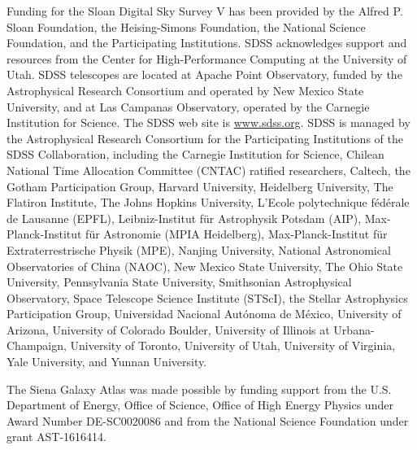 \documentclass{aa}
\begin{document}
\begin{acknowledgements}
Funding for the Sloan Digital Sky Survey V has been provided by the Alfred P. Sloan Foundation, the Heising-Simons Foundation, the National Science Foundation, and the Participating Institutions. SDSS acknowledges support and resources from the Center for High-Performance Computing at the University of Utah. SDSS telescopes are located at Apache Point Observatory, funded by the Astrophysical Research Consortium and operated by New Mexico State University, and at Las Campanas Observatory, operated by the Carnegie Institution for Science. The SDSS web site is \url{www.sdss.org}.
SDSS is managed by the Astrophysical Research Consortium for the Participating Institutions of the SDSS Collaboration, including the Carnegie Institution for Science, Chilean National Time Allocation Committee (CNTAC) ratified researchers, Caltech, the Gotham Participation Group, Harvard University, Heidelberg University, The Flatiron Institute, The Johns Hopkins University, L'Ecole polytechnique f\'{e}d\'{e}rale de Lausanne (EPFL), Leibniz-Institut f\"{u}r Astrophysik Potsdam (AIP), Max-Planck-Institut f\"{u}r Astronomie (MPIA Heidelberg), Max-Planck-Institut f\"{u}r Extraterrestrische Physik (MPE), Nanjing University, National Astronomical Observatories of China (NAOC), New Mexico State University, The Ohio State University, Pennsylvania State University, Smithsonian Astrophysical Observatory, Space Telescope Science Institute (STScI), the Stellar Astrophysics Participation Group, Universidad Nacional Aut\'{o}noma de M\'{e}xico, University of Arizona, University of Colorado Boulder, University of Illinois at Urbana-Champaign, University of Toronto, University of Utah, University of Virginia, Yale University, and Yunnan University.

The Siena Galaxy Atlas was made possible by funding support from the U.S. Department of Energy, Office of Science, Office of High Energy Physics under Award Number DE-SC0020086 and from the National Science Foundation under grant AST-1616414.

\end{acknowledgements}




\end{document}
